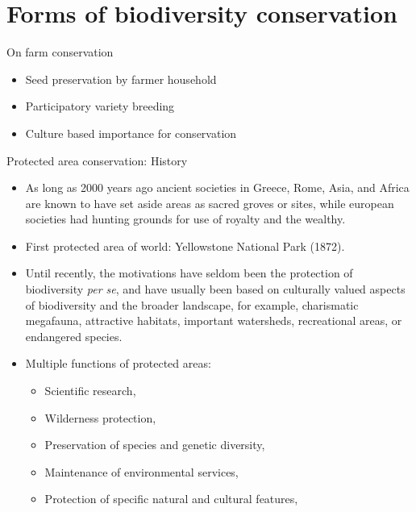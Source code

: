 \documentclass[
  ignorenonframetext,
  aspectratio=169]{beamer}
\providecommand{\tightlist}{%
  \setlength{\itemsep}{0pt}\setlength{\parskip}{0pt}}
\begin{document}
\hypertarget{forms-of-biodiversity-conservation}{%
\section{Forms of biodiversity
conservation}\label{forms-of-biodiversity-conservation}}

\begin{frame}{On farm conservation}
\protect\hypertarget{on-farm-conservation}{}
\begin{itemize}
\tightlist
\item
  Seed preservation by farmer household
\item
  Participatory variety breeding
\item
  Culture based importance for conservation
\end{itemize}
\end{frame}

\begin{frame}{Protected area conservation: History}
\protect\hypertarget{protected-area-conservation-history}{}
\begin{itemize}
\tightlist
\item
  As long as 2000 years ago ancient societies in Greece, Rome, Asia, and
  Africa are known to have set aside areas as sacred groves or sites,
  while european societies had hunting grounds for use of royalty and
  the wealthy.
\item
  First protected area of world: Yellowstone National Park (1872).
\item
  Until recently, the motivations have seldom been the protection of
  biodiversity \emph{per se}, and have usually been based on culturally
  valued aspects of biodiversity and the broader landscape, for example,
  charismatic megafauna, attractive habitats, important watersheds,
  recreational areas, or endangered species.
\item
  Multiple functions of protected areas:

  \begin{itemize}
  \tightlist
  \item
    Scientific research,
  \item
    Wilderness protection,
  \item
    Preservation of species and genetic diversity,
  \item
    Maintenance of environmental services,
  \item
    Protection of specific natural and cultural features,
  \end{itemize}
\end{itemize}
\end{frame}
\end{document}
